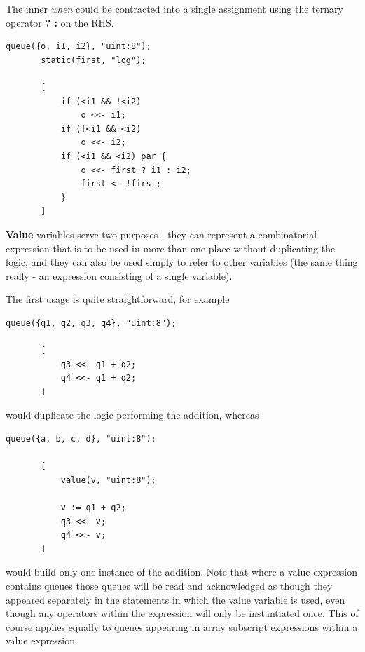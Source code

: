     The inner {\em when} could be contracted into a single assignment
    using the ternary operator {\bf? :} on the RHS.
    \begin{lstlisting}[gobble=4, language=threepl]
       queue({o, i1, i2}, "uint:8");
       static(first, "log");

       [
           if (<i1 && !<i2)
               o <<- i1;
           if (!<i1 && <i2)
               o <<- i2;
           if (<i1 && <i2) par {
               o <<- first ? i1 : i2;
               first <- !first;
           }
       ]
    \end{lstlisting}

    {\bf Value} variables serve two purposes - they can represent
    a combinatorial expression that is to be used in more than
    one place without duplicating the logic, and they can also
    be used simply to refer to other variables (the same thing
    really - an expression consisting of a single variable).

    The first usage is quite straightforward, for example
    \begin{lstlisting}[gobble=4, language=threepl]
       queue({q1, q2, q3, q4}, "uint:8");

       [
           q3 <<- q1 + q2;
           q4 <<- q1 + q2;
       ]
    \end{lstlisting}
    would duplicate the logic performing the addition, whereas
    \begin{lstlisting}[gobble=4, language=threepl]
       queue({a, b, c, d}, "uint:8");

       [
           value(v, "uint:8");

           v := q1 + q2;
           q3 <<- v;
           q4 <<- v;
       ]
    \end{lstlisting}
    would build only one instance of the addition. Note that where
    a value expression contains queues those queues will be read and
    acknowledged as though they appeared separately in the statements
    in which the value variable is used, even though any operators
    within the expression will only be instantiated once. This of course
    applies equally to queues appearing in array subscript expressions
    within a value expression.

